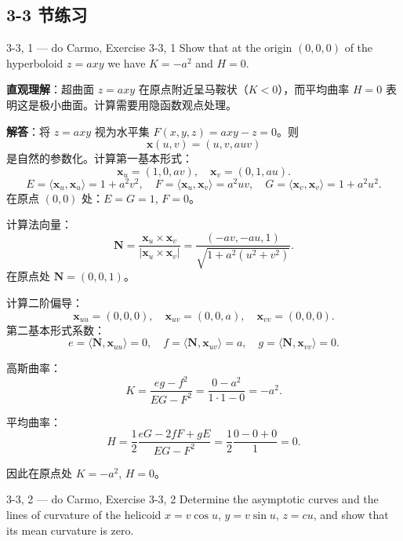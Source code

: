 \subsection*{3-3 节练习}

\begin{exercise}{3-3, 1 — do Carmo, Exercise 3-3, 1}
Show that at the origin $(0,0,0)$ of the hyperboloid $z = axy$ we have $K = -a^2$ and $H = 0$.
\end{exercise}

\begin{solution}
\textbf{直观理解}：超曲面 $z = axy$ 在原点附近呈马鞍状（$K < 0$），而平均曲率 $H = 0$ 表明这是极小曲面。计算需要用隐函数观点处理。

\textbf{解答}：将 $z = axy$ 视为水平集 $F(x,y,z) = axy - z = 0$。则
\[
\mathbf{x}(u,v) = (u, v, auv)
\]
是自然的参数化。计算第一基本形式：
\[
\mathbf{x}_u = (1, 0, av),\quad \mathbf{x}_v = (0, 1, au).
\]
\[
E = \langle \mathbf{x}_u, \mathbf{x}_u \rangle = 1 + a^2v^2,\quad
F = \langle \mathbf{x}_u, \mathbf{x}_v \rangle = a^2uv,\quad
G = \langle \mathbf{x}_v, \mathbf{x}_v \rangle = 1 + a^2u^2.
\]
在原点 $(0,0)$ 处：$E = G = 1$, $F = 0$。

计算法向量：
\[
\mathbf{N} = \frac{\mathbf{x}_u \times \mathbf{x}_v}{|\mathbf{x}_u \times \mathbf{x}_v|}
= \frac{(-av, -au, 1)}{\sqrt{1 + a^2(u^2+v^2)}}.
\]
在原点处 $\mathbf{N} = (0,0,1)$。

计算二阶偏导：
\[
\mathbf{x}_{uu} = (0,0,0),\quad \mathbf{x}_{uv} = (0,0,a),\quad \mathbf{x}_{vv} = (0,0,0).
\]
第二基本形式系数：
\[
e = \langle \mathbf{N}, \mathbf{x}_{uu} \rangle = 0,\quad
f = \langle \mathbf{N}, \mathbf{x}_{uv} \rangle = a,\quad
g = \langle \mathbf{N}, \mathbf{x}_{vv} \rangle = 0.
\]

高斯曲率：
\[
K = \frac{eg - f^2}{EG - F^2} = \frac{0 - a^2}{1 \cdot 1 - 0} = -a^2.
\]

平均曲率：
\[
H = \frac{1}{2}\frac{eG - 2fF + gE}{EG - F^2} = \frac{1}{2}\frac{0 - 0 + 0}{1} = 0.
\]

因此在原点处 $K = -a^2$, $H = 0$。
\end{solution}

\begin{exercise}{3-3, 2 — do Carmo, Exercise 3-3, 2}
Determine the asymptotic curves and the lines of curvature of the helicoid $x = v \cos u$, $y = v \sin u$, $z = cu$, and show that its mean curvature is zero.
\end{exercise}

